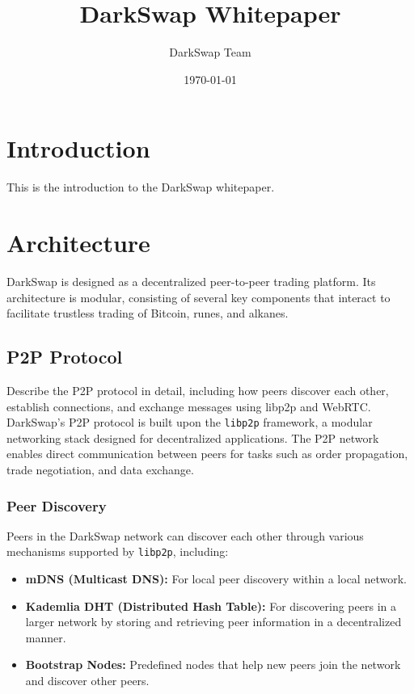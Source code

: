 \documentclass{article}
\title{DarkSwap Whitepaper}
\author{DarkSwap Team}
\date{\today}
\begin{document}
\maketitle

\section{Introduction}
This is the introduction to the DarkSwap whitepaper.

\section{Architecture}
DarkSwap is designed as a decentralized peer-to-peer trading platform. Its architecture is modular, consisting of several key components that interact to facilitate trustless trading of Bitcoin, runes, and alkanes.


\subsection{P2P Protocol}
Describe the P2P protocol in detail, including how peers discover each other, establish connections, and exchange messages using libp2p and WebRTC.
DarkSwap's P2P protocol is built upon the \texttt{libp2p} framework, a modular networking stack designed for decentralized applications. The P2P network enables direct communication between peers for tasks such as order propagation, trade negotiation, and data exchange.

\subsubsection{Peer Discovery}
Peers in the DarkSwap network can discover each other through various mechanisms supported by \texttt{libp2p}, including:
\begin{itemize}
    \item \textbf{mDNS (Multicast DNS):} For local peer discovery within a local network.
    \item \textbf{Kademlia DHT (Distributed Hash Table):} For discovering peers in a larger network by storing and retrieving peer information in a decentralized manner.
    \item \textbf{Bootstrap Nodes:} Predefined nodes that help new peers join the network and discover other peers.
\end{itemize}
\end{document}
